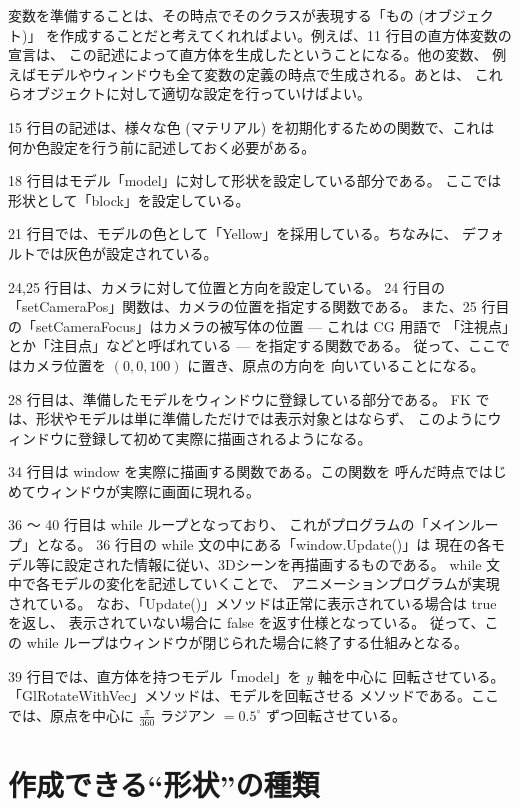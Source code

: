 変数を準備することは、その時点でそのクラスが表現する「もの (オブジェクト)」
を作成することだと考えてくれればよい。例えば、11 行目の直方体変数の宣言は、
この記述によって直方体を生成したということになる。他の変数、
例えばモデルやウィンドウも全て変数の定義の時点で生成される。あとは、
これらオブジェクトに対して適切な設定を行っていけばよい。

15 行目の記述は、様々な色 (マテリアル) を初期化するための関数で、これは
何か色設定を行う前に記述しておく必要がある。

18 行目はモデル「model」に対して形状を設定している部分である。
ここでは形状として「block」を設定している。

21 行目では、モデルの色として「Yellow」を採用している。ちなみに、
デフォルトでは灰色が設定されている。

24,25 行目は、カメラに対して位置と方向を設定している。
24 行目の「setCameraPos」関数は、カメラの位置を指定する関数である。
また、25 行目の「setCameraFocus」はカメラの被写体の位置 --- これは CG 用語で
「注視点」とか「注目点」などと呼ばれている --- を指定する関数である。
従って、ここではカメラ位置を \((0, 0, 100)\) に置き、原点の方向を
向いていることになる。

28 行目は、準備したモデルをウィンドウに登録している部分である。
FK では、形状やモデルは単に準備しただけでは表示対象とはならず、
このようにウィンドウに登録して初めて実際に描画されるようになる。

34 行目は window を実際に描画する関数である。この関数を
呼んだ時点ではじめてウィンドウが実際に画面に現れる。

36 〜 40 行目は while ループとなっており、
これがプログラムの「メインループ」となる。
36 行目の while 文の中にある「window.Update()」は
現在の各モデル等に設定された情報に従い、3Dシーンを再描画するものである。
while 文中で各モデルの変化を記述していくことで、
アニメーションプログラムが実現されている。
なお、「Update()」メソッドは正常に表示されている場合は true を返し、
表示されていない場合に false を返す仕様となっている。
従って、この while ループはウィンドウが閉じられた場合に終了する仕組みとなる。

39 行目では、直方体を持つモデル「model」を \(y\) 軸を中心に
回転させている。「GlRotateWithVec」メソッドは、モデルを回転させる
メソッドである。ここでは、原点を中心に \(\frac{\pi}{360}\) ラジアン \(= 0.5^\circ\)
ずつ回転させている。

\section{作成できる``形状''の種類}

